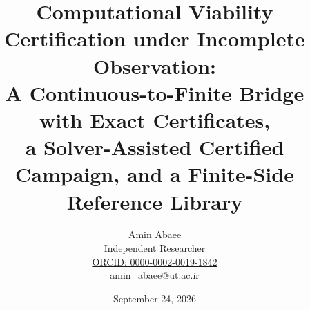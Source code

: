\documentclass[10pt,twocolumn]{article}
\theoremstyle{plain}
\theoremstyle{definition}
\theoremstyle{remark}
\begin{document}
\title{Computational Viability Certification under Incomplete Observation:\\
A Continuous-to-Finite Bridge with Exact Certificates,\\
a Solver-Assisted Certified Campaign, and a Finite-Side Reference Library}
\newcommand{\edition}{2}
\author{Amin Abaee\\[0.35em]
{\small Independent Researcher}\\[0.55em]
{\small\href{https://orcid.org/0000-0002-0019-1842}{ORCID: 0000-0002-0019-1842}}\\[0.3em]
{\small\href{mailto:amin\_abaee@ut.ac.ir}{amin\_abaee@ut.ac.ir}}}
\date{September 24, 2026}
\maketitle
\end{document}
